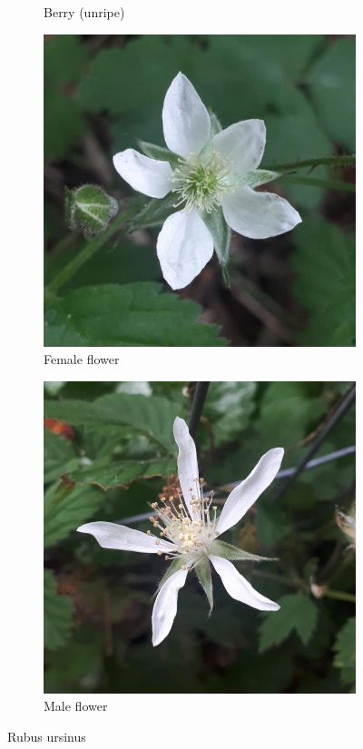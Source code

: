 \begin{figure}
\begin{subfigure}{0.47\textwidth}
    \caption{Berry (unripe)}
    \label{fig:rub:ursinus:berry}
\end{subfigure}
\hfill
\begin{subfigure}{0.47\textwidth}
    \includegraphics[width=\textwidth]{rubus/ursinus_flower_female_01}
    \caption{Female flower}
    \label{fig:rub:ursinus:flower:female}
\end{subfigure}
\hfill
\begin{subfigure}{0.47\textwidth}
    \includegraphics[width=\textwidth]{rubus/ursinus_flower_male_02}
    \caption{Male flower}
    \label{fig:rub:ursinus:flower:male}
\end{subfigure}
        
\caption{Rubus ursinus}
\label{fig:rub:ursinus}
\end{figure}

